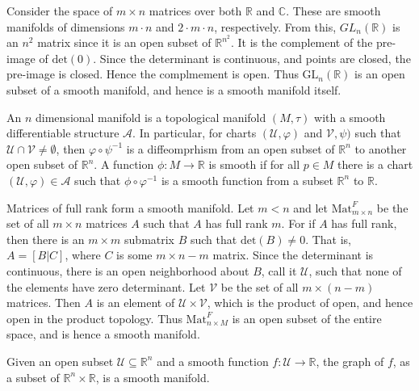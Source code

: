         \begin{example}
            Consider the space of $m\times{n}$ matrices over both $\mathbb{R}$
            and $\mathbb{C}$. These are smooth manifolds of dimensions
            $m\cdot{n}$ and $2\cdot{m}\cdot{n}$, respectively. From this,
            $GL_{n}(\mathbb{R})$ is an $n^{2}$ matrix since it is an open subset
            of $\mathbb{R}^{n^{2}}$. It is the complement of the pre-image of
            $\textrm{det}(0)$. Since the determinant is continuous, and points
            are closed, the pre-image is closed. Hence the complmement is open.
            Thus $\textrm{GL}_{n}(\mathbb{R})$ is an open subset of a smooth
            manifold, and hence is a smooth manifold itself.
        \end{example}
        An $n$ dimensional manifold is a topological manifold $(M,\tau)$ with a
        smooth differentiable structure $\mathcal{A}$. In particular, for charts
        $(\mathcal{U},\varphi)$ and $\mathcal{V},\psi)$ such that
        $\mathcal{U}\cap\mathcal{V}\ne\emptyset$, then
        $\varphi\circ\psi^{\minus{1}}$ is a diffeomprhism from an open subset of
        $\mathbb{R}^{n}$ to another open subset of $\mathbb{R}^{n}$. A function
        $\phi:M\rightarrow\mathbb{R}$ is smooth if for all $p\in{M}$ there is a
        chart $(\mathcal{U},\varphi)\in\mathcal{A}$ such that
        $\phi\circ\varphi^{\minus{1}}$ is a smooth function from a subset
        $\mathbb{R}^{n}$ to $\mathbb{R}$.
        \begin{example}
            Matrices of full rank form a smooth manifold. Let $m<n$ and let
            $\textrm{Mat}_{m\times{n}}^{F}$ be the set of all $m\times{n}$
            matrices $A$ such that $A$ has full rank $m$. For if $A$ has full
            rank, then there is an $m\times{m}$ submatrix $B$ such that
            $\textrm{det}(B)\ne{0}$. That is, $A=[B|C]$, where $C$ is some
            $m\times{n-m}$ matrix. Since the determinant is continuous, there
            is an open neighborhood about $B$, call it $\mathcal{U}$, such that
            none of the elements have zero determinant. Let $\mathcal{V}$ be
            the set of all $m\times(n-m)$ matrices. Then $A$ is an element of
            $\mathcal{U}\times\mathcal{V}$, which is the product of open, and
            hence open in the product topology. Thus
            $\textrm{Mat}_{n\times{M}}^{F}$ is an open subset of the entire
            space, and is hence a smooth manifold.
        \end{example}
        \begin{example}
            Given an open subset $\mathcal{U}\subseteq\mathbb{R}^{n}$ and a
            smooth function $f:\mathcal{U}\rightarrow\mathbb{R}$, the graph of
            $f$, as a subset of $\mathbb{R}^{n}\times\mathbb{R}$, is a smooth
            manifold.
        \end{example}
